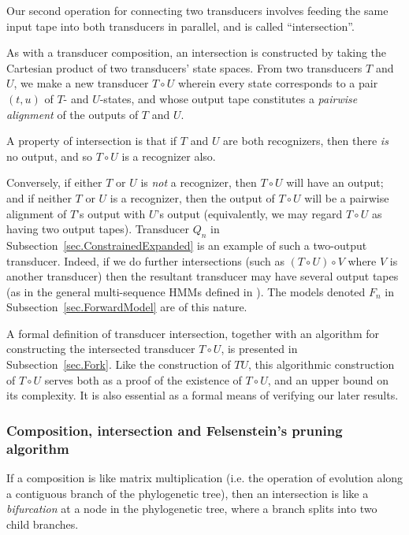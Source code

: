 \documentclass{article}
\newcommand{\secref}[1]{Subsection~\ref{sec.#1}}
\newcommand{\seclabel}[1]{\label{sec.#1}}
\newcommand\fork{\circ}
\begin{document}
Our second operation for connecting two transducers
involves feeding the same input tape into both transducers in parallel,
and is called ``intersection''.

As with a transducer composition,
an intersection is constructed by taking the Cartesian product of two transducers' state spaces.
From two transducers $T$ and $U$,
we make a new transducer $T \fork U$
wherein every state corresponds to a pair $(t,u)$ of $T$- and $U$-states,
and whose output tape constitutes a {\em pairwise alignment} of the outputs of $T$ and $U$.

A property of intersection is that
if $T$ and $U$ are both recognizers,
then there {\em is} no output, and so $T \fork U$ is a recognizer also.

Conversely, if either $T$ or $U$ is {\em not} a recognizer, then $T \fork U$ will have an output;
and if neither $T$ or $U$ is a recognizer, then the output of $T \fork U$ will be a pairwise alignment
of $T$'s output with $U$'s output
(equivalently, we may regard $T \fork U$ as having two output tapes).
Transducer $Q_n$ in \secref{ConstrainedExpanded} is an example of such a two-output transducer.
Indeed, if we do further intersections (such as $(T \fork U) \fork V$ where $V$ is another transducer)
then the resultant transducer may have several output tapes
(as in the general multi-sequence HMMs defined in \cite{HolmesBruno2001}).
The models denoted $F_n$ in \secref{ForwardModel} are of this nature.

A formal definition of transducer intersection,
together with an algorithm for constructing the intersected transducer $T \fork U$,
is presented in \secref{Fork}. 
Like the construction of $TU$, this algorithmic construction of $T \fork U$
serves both as a proof of the existence of $T \fork U$, and an upper bound on its complexity.
It is also essential as a formal means of verifying our later results.

\subsubsection{Composition, intersection and Felsenstein's pruning algorithm}
\seclabel{Felsenstein}

If a composition is like matrix multiplication
(i.e. the operation of evolution along a contiguous branch of the phylogenetic tree),
then an intersection is like a {\em bifurcation} at a node in the phylogenetic tree,
where a branch splits into two child branches.
\end{document}
